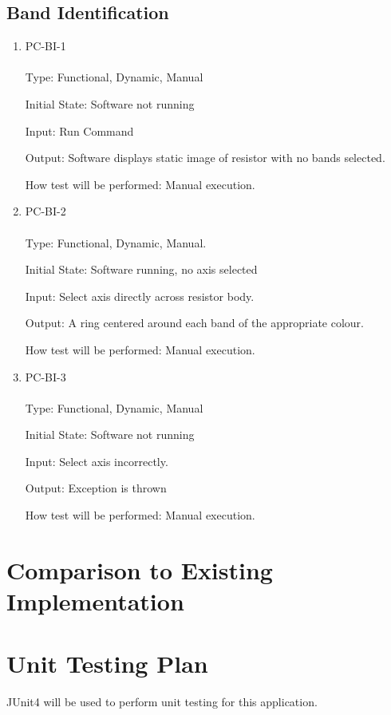 \documentclass[12pt, titlepage]{article}
\begin{document}
\subsection{Band Identification}
\begin{enumerate}
\item{PC-BI-1\\}
\\
Type: Functional, Dynamic, Manual
					
Initial State: Software not running
					
Input: Run Command
					
Output: Software displays static image of resistor with no bands selected.
					
How test will be performed: Manual execution.
					
\item{PC-BI-2\\}
\\
Type: Functional, Dynamic, Manual.
					
Initial State: Software running, no axis selected
					
Input: Select axis directly across resistor body.
					
Output:  A ring centered around each band of the appropriate colour.
					
How test will be performed:  Manual execution.

\item{PC-BI-3\\}
\\
Type: Functional, Dynamic, Manual
					
Initial State: Software not running
					
Input: Select axis incorrectly.
					
Output: Exception is thrown
					
How test will be performed: Manual execution.

\end{enumerate}
	
\section{Comparison to Existing Implementation}	
\section{Unit Testing Plan}	
\par JUnit4 will be used to perform unit testing for this application.	
\end{document}
